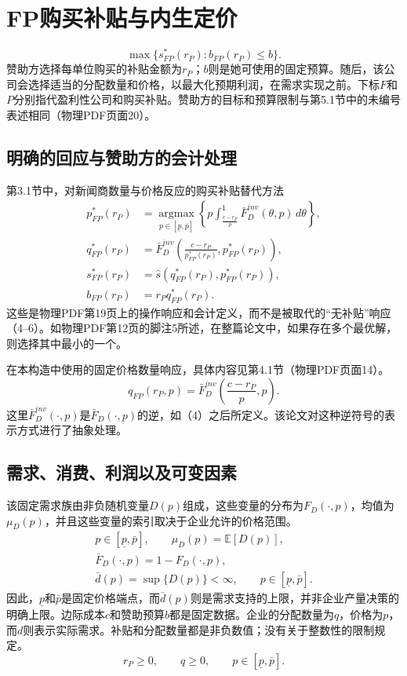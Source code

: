 \documentclass{article}
\begin{document}
\section*{FP购买补贴与内生定价}

\[
\boxed{\max\bigl\{s_{FP}^{*}(r_P):b_{FP}(r_P)\leq b\bigr\}.}
\]
赞助方选择每单位购买的补贴金额为$r_P$；$b$则是她可使用的固定预算。随后，该公司会选择适当的分配数量和价格，以最大化预期利润，在需求实现之前。下标$F$和$P$分别指代盈利性公司和购买补贴。赞助方的目标和预算限制与第5.1节中的未编号表述相同（物理PDF页面20）。

\subsection*{明确的回应与赞助方的会计处理}

第3.1节中，对新闻商数量与价格反应的购买补贴替代方法
\begin{align*}
p_{FP}^{*}(r_P)
&=\operatorname*{argmax}_{p\in[\underline p,\bar p]}
\left\{p\int_{\frac{c-r_P}{p}}^{1}
\bar F_D^{inv}(\theta,p)\,d\theta\right\},\\
q_{FP}^{*}(r_P)
&=\bar F_D^{inv}\!\left(
\frac{c-r_P}{p_{FP}^{*}(r_P)},p_{FP}^{*}(r_P)
\right),\\
s_{FP}^{*}(r_P)
&=\hat s\!\left(q_{FP}^{*}(r_P),p_{FP}^{*}(r_P)\right),\\
b_{FP}(r_P)&=r_Pq_{FP}^{*}(r_P).
\end{align*}
这些是物理PDF第19页上的操作响应和会计定义，而不是被取代的“无补贴”响应（4–6）。如物理PDF第12页的脚注5所述，在整篇论文中，如果存在多个最优解，则选择其中最小的一个。

在本构造中使用的固定价格数量响应，具体内容见第4.1节（物理PDF页面14）。
\[
q_{FP}(r_P,p)=\bar F_D^{inv}\!\left(\frac{c-r_P}{p},p\right).
\]
这里$\bar F_D^{inv}(\cdot,p)$是$\bar F_D(\cdot,p)$的逆，如（4）之后所定义。该论文对这种逆符号的表示方式进行了抽象处理。

\subsection*{需求、消费、利润以及可变因素}

该固定需求族由非负随机变量$D(p)$组成，这些变量的分布为$F_D(\cdot,p)$，均值为$\mu_D(p)$，并且这些变量的索引取决于企业允许的价格范围。
\begin{gather*}
p\in[\underline p,\bar p],\qquad
\mu_D(p)=\mathbb E[D(p)],\\
\bar F_D(\cdot,p)=1-F_D(\cdot,p),\\
\bar d(p)=\sup\{D(p)\}<\infty,
\qquad p\in[\underline p,\bar p].
\end{gather*}
因此，$\underline p$和$\bar p$是固定价格端点，而$\bar d(p)$则是需求支持的上限，并非企业产量决策的明确上限。边际成本$c$和赞助预算$b$都是固定数据。企业的分配数量为$q$，价格为$p$，而$d$则表示实际需求。补贴和分配数量都是非负数值；没有关于整数性的限制规定。
\[
r_P\geq0,\qquad q\geq0,\qquad p\in[\underline p,\bar p].
\]
\end{document}
